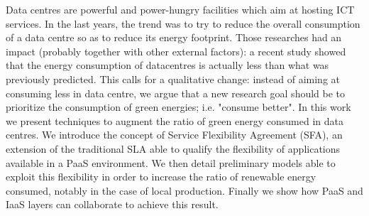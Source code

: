 
Data centres are powerful and power-hungry facilities which aim at hosting ICT services.
In the last years, the trend was to try to reduce the overall consumption of a data centre so as to reduce its energy footprint.
Those researches had an impact (probably together with other external factors): a recent study showed that the energy consumption of datacentres is actually less than what was previously predicted.
This calls for a qualitative change: instead of aiming at consuming less in data centre, we argue that a new research goal should be to prioritize the consumption of green energies; i.e. "consume better".
In this work we present techniques to augment the ratio of green energy consumed in data centres.
We introduce the concept of Service Flexibility Agreement (SFA), an extension of the traditional SLA able to qualify the flexibility of applications available in a PaaS environment.
We then detail preliminary models able to exploit this flexibility in order to increase the ratio of renewable energy consumed, notably in the case of local production. 
Finally we show how PaaS and IaaS layers can collaborate to achieve this result.





